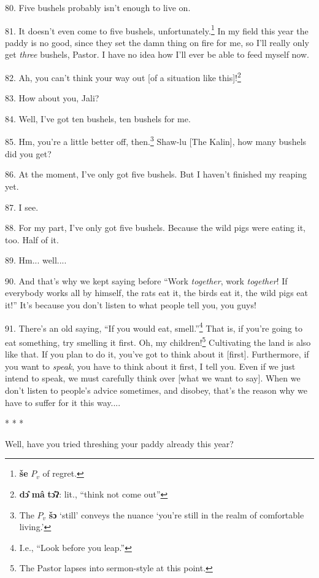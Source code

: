 80. Five bushels probably isn't enough to live on.

81. It doesn't even come to five bushels, unfortunately.\footnote{\textbf{še} $P_v$ of regret.} In my field this year
the paddy is no good, since they set the damn thing on fire for me, so I'll really
only get \textit{three} bushels, Pastor. I have no idea how I'll ever be able to
feed myself now.

82. Ah, you can't think your way out [of a situation like this]!\footnote{\textbf{dɔ̂} \textbf{mâ} \textbf{tɔ̂ʔ}: lit., ``think not come out''}

83. How about you, Jali?

84. Well, I've got ten bushels, ten bushels for me.

85. Hm, you're a little better off, then.\footnote{The $P_v$ \textbf{šɔ} `still' conveys the nuance `you're still in the realm of comfortable living.'} Shaw-lu [The Kalin], how many bushels
did you get?

86. At the moment, I've only got five bushels. But I haven't finished my reaping
yet.

87. I see.

88. For my part, I've only got five bushels. Because the wild pigs were eating
it, too. Half of it.

89. Hm... well....

90. And that's why we kept saying before ``Work\textit{ together}, work
\textit{together}! If everybody works all by himself, the rats eat it, the birds
eat it, the wild pigs eat it!'' It's because you don't listen to what people
tell you, you guys!

91. There's an old saying, ``If you would eat, smell.''\footnote{I.e., ``Look before you leap.''} That
is, if you're going to eat something, try smelling it first. Oh, my children!\footnote{The Pastor lapses into sermon-style at this point.}
Cultivating the land is also like that. If you plan to do it, you've got to think
about it [first]. Furthermore, if you want to \textit{speak}, you have to think
about it first, I tell you. Even if we just intend to speak, we must carefully
think over [what we want to say]. When we don't listen to people's advice sometimes,
and disobey, that's the reason why we have to suffer for it this way....

\begin{center}
* * *
\end{center}

Well, have you tried threshing your paddy already this year?

